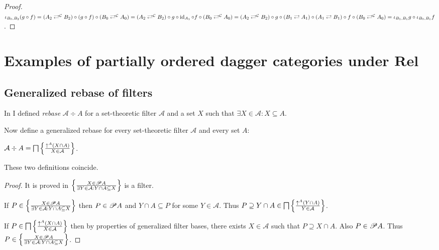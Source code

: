 \begin{proof}
  $\iota_{B_0, B_2} (g \circ f) = (A_2 \rightleftarrows^{\mathcal{C}} B_2)
  \circ (g \circ f) \circ (B_0 \rightleftarrows^{\mathcal{C}} A_0) = (A_2
  \rightleftarrows^{\mathcal{C}} B_2) \circ g \circ \operatorname{id}_{A_1} \circ f
  \circ (B_0 \rightleftarrows^{\mathcal{C}} A_0) = (A_2
  \rightleftarrows^{\mathcal{C}} B_2) \circ g \circ (B_1 \rightleftarrows A_1)
  \circ (A_1 \rightleftarrows B_1) \circ f \circ (B_0
  \rightleftarrows^{\mathcal{C}} A_0) = \iota_{B_1, B_1} g \circ \iota_{B_0,
  B_1} f$.
\end{proof}

\section{\texorpdfstring{Examples of partially ordered dagger categories under
$\mathbf{Rel}$}{Examples of partially ordered dagger categories under Rel}}

\subsection{Generalized rebase of filters}

In \cite{volume-1} I defined \emph{rebase} $\mathcal{A} \div A$ for a
set-theoretic filter $\mathcal{A}$ and a set $X$ such that $\exists X \in
\mathcal{A} : X \subseteq A$.

Now define a generalized rebase for every set-theoretic filter $\mathcal{A}$
and every set $A$:

\begin{defn}
  $\mathcal{A} \div A = \bigsqcap \left\{ \frac{ \uparrow^A  (X \cap A) }{ X \in \mathcal{A} }\right\}$.
\end{defn}

\begin{prop}
  These two definitions coincide.
\end{prop}

\begin{proof}
  It is proved in
{\cite{volume-1}} $\left\{ \frac{ X \in \mathscr{P} A }{\exists Y \in \mathcal{A} : Y\cap A \subseteq X }\right\}$ is a filter.

If $P \in \left\{ \frac{ X \in \mathscr{P} A }{ \exists Y
\in \mathcal{A} : Y\cap A \subseteq X }\right\}$ then $P \in \mathscr{P} A$ and $Y\cap A
\subseteq P$ for some $Y \in \mathcal{A}$. Thus $P \supseteq Y \cap A \in
\bigsqcap \left\{ \frac{ \uparrow^A  (Y \cap A) }{ Y \in \mathcal{A} }\right\}$.

If $P \in \bigsqcap \left\{ \frac{ \uparrow^A  (X \cap A) }{
X \in \mathcal{A} }\right\}$ then by properties of generalized filter bases,
there exists $X \in \mathcal{A}$ such that $P \supseteq X \cap A$. Also $P \in
\mathscr{P} A$. Thus $P \in \left\{ \frac{ X \in \mathscr{P} A
}{ \exists Y \in \mathcal{A} : Y\cap A \subseteq X }\right\}$.

\end{proof}

